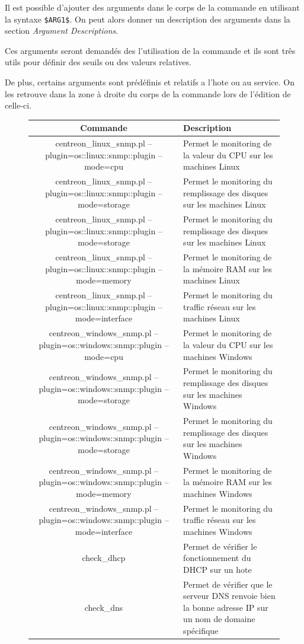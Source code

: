 		Il est possible d'ajouter des arguments dans le corps de la commande en utilisant la syntaxe \texttt{\$ARG1\$}.
		On peut alors donner un description des arguments dans la section \emph{Argument Descriptions}.

		Ces arguments seront demandés des l'utilisation de la commande et ils sont três utils pour définir des seuils ou des valeurs relatives.

		De plus, certains arguments sont prédéfinis et relatifs a l'hote ou au service.
		On les retrouve dans la zone à droite du corps de la commande lors de l'édition de celle-ci.

		\begin{figure}
			\begin{tabulary}{\textwidth}{|C|L|}
				\hline
				Commande & Description \\
				\hline
				\hline
				centreon\_linux\_snmp.pl --plugin=os::linux::snmp::plugin --mode=cpu & Permet le monitoring de la valeur du CPU sur les machines Linux\\
				\hline
				centreon\_linux\_snmp.pl --plugin=os::linux::snmp::plugin --mode=storage & Permet le monitoring du remplissage des disques sur les machines Linux\\
				\hline
				centreon\_linux\_snmp.pl --plugin=os::linux::snmp::plugin --mode=storage & Permet le monitoring du remplissage des disques sur les machines Linux\\
				\hline
				centreon\_linux\_snmp.pl --plugin=os::linux::snmp::plugin --mode=memory & Permet le monitoring de la mémoire RAM sur les machines Linux\\
				\hline
				centreon\_linux\_snmp.pl --plugin=os::linux::snmp::plugin --mode=interface & Permet le monitoring du traffic réseau sur les machines Linux\\
				\hline
				\hline
				centreon\_windows\_snmp.pl --plugin=os::windows::snmp::plugin --mode=cpu & Permet le monitoring de la valeur du CPU sur les machines Windows\\
				\hline
				centreon\_windows\_snmp.pl --plugin=os::windows::snmp::plugin --mode=storage & Permet le monitoring du remplissage des disques sur les machines Windows\\
				\hline
				centreon\_windows\_snmp.pl --plugin=os::windows::snmp::plugin --mode=storage & Permet le monitoring du remplissage des disques sur les machines Windows\\
				\hline
				centreon\_windows\_snmp.pl --plugin=os::windows::snmp::plugin --mode=memory & Permet le monitoring de la mémoire RAM sur les machines Windows\\
				\hline
				centreon\_windows\_snmp.pl --plugin=os::windows::snmp::plugin --mode=interface & Permet le monitoring du traffic réseau sur les machines Windows\\
				\hline
				\hline
				check\_dhcp & Permet de vérifier le fonctionnement du DHCP sur un hote\\
				\hline
				check\_dns & Permet de vérifier que le serveur DNS renvoie bien la bonne adresse IP sur un nom de domaine spécifique\\
				\hline


\end{tabulary}
\end{figure}
